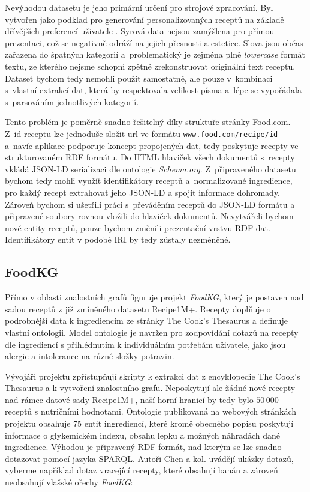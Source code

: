 Nevýhodou datasetu je jeho primární určení pro strojové zpracování. Byl vytvořen jako podklad pro generování personalizovaných receptů na základě dřívějších preferencí uživatele \citep{majumder-etal-2019-generating}. Syrová data nejsou zamýšlena pro přímou prezentaci, což se negativně odráží na jejich přesnosti a estetice. Slova jsou občas zařazena do špatných kategorií a~problematický je zejména plně \emph{lowercase} formát textu, ze kterého nejsme schopni zpětně zrekonstruovat originální text receptu. Dataset bychom tedy nemohli použít samostatně, ale pouze v~kombinaci s~vlastní extrakcí dat, která by respektovala velikost písma a~lépe se vypořádala s~parsováním jednotlivých kategorií.

Tento problém je poměrně snadno řešitelný díky struktuře stránky Food.com. Z~id receptu lze jednoduše složit url ve formátu \texttt{www.food.com/recipe/id} a~navíc aplikace podporuje koncept propojených dat, tedy poskytuje recepty ve strukturovaném RDF formátu. Do HTML hlaviček všech dokumentů s~recepty vkládá JSON-LD serializaci dle ontologie \emph{Schema.org}. Z~připraveného datasetu bychom tedy mohli využít identifikátory receptů a~normalizované ingredience, pro každý recept extrahovat jeho JSON-LD a spojit informace dohromady. Zároveň bychom si ušetřili práci s~převáděním receptů do JSON-LD formátu a připravené soubory rovnou vložili do hlaviček dokumentů. Nevytvářeli bychom nové entity receptů, pouze bychom změnili prezentační vrstvu RDF dat. Identifikátory entit v podobě IRI by tedy zůstaly nezměněné.

\subsection{FoodKG}

Přímo v oblasti znalostních grafů figuruje projekt \emph{FoodKG}, který je postaven nad sadou receptů z již zmíněného datasetu Recipe1M+. Recepty doplňuje o podrobnější data k ingrediencím ze stránky The Cook's Thesaurus a definuje vlastní ontologii. Model ontologie je navržen pro zodpovídání dotazů na recepty dle ingrediencí s přihlédnutím k individuálním potřebám uživatele, jako jsou alergie a intolerance na různé složky potravin.

Vývojáři projektu zpřístupňují skripty k extrakci dat z encyklopedie The Cook's Thesaurus a k vytvoření znalostního grafu. Neposkytují ale žádné nové recepty nad rámec datové sady Recipe1M+, naší horní hranicí by tedy bylo $50\,000$ receptů s nutričními hodnotami. Ontologie publikovaná na webových stránkách projektu obsahuje $75$ entit ingrediencí, které kromě obecného popisu poskytují informace o glykemickém indexu, obsahu lepku a možných náhradách dané ingredience. Výhodou je připravený RDF formát, nad kterým se lze snadno dotazovat pomocí jazyka SPARQL. Autoři Chen a kol. uvádějí ukázky dotazů, vyberme například dotaz vracející recepty, které obsahují banán a zároveň neobsahují vlašské ořechy \emph{FoodKG}:

